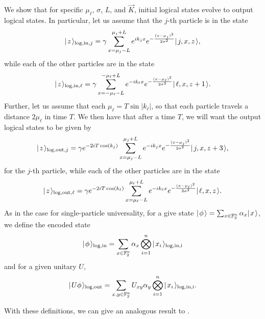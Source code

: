 \documentclass[../thesis-main/thesis-main]{subfiles}
\begin{document}
We show that for specific $\mu_\ell$, $\sigma$, $L$, and $\vec{K}$, initial logical states evolve to output logical states.  In particular, let us assume that the $j$-th particle is in the state
\begin{align}
  |\mspace{2mu} z \mspace{2mu} \rangle_{\text{log},\text{in},j} = \gamma \sum_{x = \mu_j - L}^{\mu_j + L} e^{ i k_j x} e^{ - \frac{(x-\mu_j)^2}{2\sigma^2}} |\mspace{2mu} j,x,z \mspace{2mu} \rangle,
  \label{eq:single_qubit_important_state_in}
\end{align}
while each of the other particles are in the state
\begin{align}
  |\mspace{2mu} z \mspace{2mu} \rangle_{\text{log},\text{in},\ell} = \gamma \sum_{x = -\mu_\ell-L}^{-\mu_\ell + L} e^{- i k_\ell x} e^{ - \frac{(x-\mu_\ell)^2}{2\sigma^2}} |\mspace{2mu} \ell,x,z+1 \mspace{2mu} \rangle.
\end{align}
Further, let us assume that each $\mu_\ell = T \sin |k_\ell|$, so that each particle travels a distance $2 \mu_\ell$ in time $T$.  We then have that after a time $T$, we will want the output logical states to be given by 
\begin{align}
  |\mspace{2mu} z \mspace{2mu} \rangle_{\text{log},\text{out},j} = \gamma e^{-2iT \cos(k_j)}\sum_{x = \mu_j - L}^{\mu_j + L} e^{- i k_j x} e^{ - \frac{(x-\mu_j)^2}{2\sigma^2}} |\mspace{2mu} j,x,z+3 \mspace{2mu} \rangle,
  \label{eq:single_qubit_important_state_out}
\end{align}
for the $j$-th particle, while each of the other particles are in the state
\begin{align}
  |\mspace{2mu} z \mspace{2mu} \rangle_{\text{log},\text{out},\ell} = \gamma e^{-2i T \cos(k_\ell)} \sum_{x = \mu_\ell-L}^{\mu_\ell + L} e^{- i k_\ell x} e^{ - \frac{(x-\mu_\ell)^2}{2\sigma^2}} |\mspace{2mu} \ell,x,z \mspace{2mu} \rangle.
\end{align}
As in the case for single-particle universality, for a give state $|\mspace{2mu} \phi \mspace{2mu} \rangle = \sum_{x\in \mathbb{F}_2^n} \alpha_x |\mspace{2mu} x \mspace{2mu} \rangle$, we define the encoded state
\begin{align}
  |\mspace{2mu} \phi \mspace{2mu} \rangle_{\text{log,in}} = \sum_{x\in \mathbb{F}_2^n} \alpha_{x} \bigotimes_{i=1}^n |\mspace{2mu} x_i \mspace{2mu} \rangle_{\text{log},\text{in,i}}\label{eq:MP_single_input_encoding}
\end{align}
and for a given unitary $U$,
\begin{align}
  |\mspace{2mu} U\phi \mspace{2mu} \rangle_{\text{log,out}} = \sum_{x,y\in \mathbb{F}_2^n} U_{xy}\alpha_{y} \bigotimes_{i=1}^n |\mspace{2mu} x_i \mspace{2mu} \rangle_{\text{log},\text{in,i}}.\label{eq:MP_single_output_encoding}
\end{align}

With these definitions, we can give an analogous result to .
\end{document}
